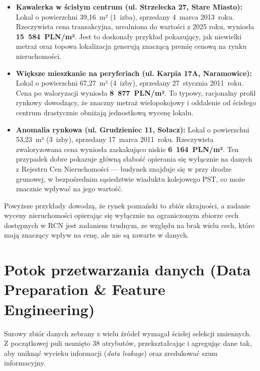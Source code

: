 \documentclass[12pt,a4paper]{article}
\begin{document}
\begin{itemize}
  \item \textbf{Kawalerka w ścisłym centrum (ul. Strzelecka 27, Stare Miasto):}
        Lokal o powierzchni 39,16~m² (1~izba), sprzedany 4~marca 2013~roku.
        Rzeczywista cena transakcyjna, urealniona do wartości z 2025 roku, wyniosła \textbf{15~584~PLN/m²}.
        Jest to doskonały przykład pokazujący, jak niewielki metraż oraz topowa lokalizacja generują znaczącą premię cenową na rynku nieruchomości.

  \item \textbf{Większe mieszkanie na peryferiach (ul. Karpia 17A, Naramowice):}
        Lokal o powierzchni 67,27~m² (4~izby), sprzedany 27~stycznia 2011~roku.
        Cena po waloryzacji wyniosła \textbf{8~877~PLN/m²}.
        To typowy, racjonalny profil rynkowy dowodzący, że znaczny metraż wielopokojowy i oddalenie od ścisłego centrum drastycznie obniżają jednostkową wycenę lokalu.

  \item \textbf{Anomalia rynkowa (ul. Grudzieniec 11, Sołacz):}
        Lokal o powierzchni 53,23~m² (3~izby), sprzedany 17~marca 2011~roku.
        Rzeczywista zwaloryzowana cena wyniosła zaskakująco niskie \textbf{6~164~PLN/m²}.
        Ten przypadek dobre pokazuje główną słabość opierania się wyłącznie na danych z Rejestru Cen Nieruchomości --- budynek znajduje się w przy drodze grunowej, w bezpośrednim sąsiedztwie wiaduktu kolejowego PST, co może znacznie wpływać na jego wartość.
\end{itemize}

Powyższe przykłady dowodzą, że rynek poznański to zbiór skrajności, a zadanie wyceny nieruchomości opierając się wyłącznie na ograniczonym zbiorze cech dostępnych w RCN jest zadaniem trudnym, ze względu na brak wielu cech, które mają znaczący wpływ na cenę, ale nie są zawarte w danych.

\section{Potok przetwarzania danych (Data Preparation \& Feature Engineering)}

Surowy zbiór danych zebrany z wielu źródeł wymagał ścisłej selekcji zmiennych. Z początkowej puli usunięto 38 atrybutów, przekształcając i agregując dane tak, aby uniknąć wycieku informacji (\textit{data leakage}) oraz zredukować szum informacyjny.
\end{document}
